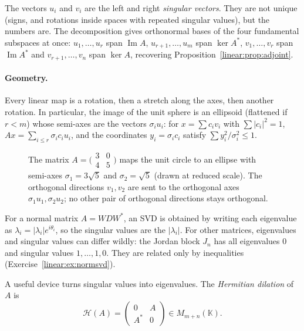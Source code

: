 The vectors $u_i$ and $v_i$ are the left and right \emph{singular vectors}. They are not unique (signs, and rotations inside
spaces with repeated singular values), but the numbers are. The decomposition gives orthonormal bases of the four
fundamental subspaces at once: $u_1,\dots,u_r$ span $\operatorname{Im}A$, $u_{r+1},\dots,u_m$ span $\ker A^*$, $v_1,\dots,v_r$
span $\operatorname{Im}A^*$ and $v_{r+1},\dots,v_n$ span $\ker A$, recovering Proposition~\ref{linear:prop:adjoint}.

\paragraph{Geometry.} Every linear map is a rotation, then a stretch along the axes, then another rotation. In particular,
the image of the unit sphere is an ellipsoid (flattened if $r<m$) whose semi-axes are the vectors $\sigma_iu_i$: for
$x=\sum c_iv_i$ with $\sum|c_i|^2=1$, $Ax=\sum_{i\le r}\sigma_ic_iu_i$, and the coordinates $y_i=\sigma_ic_i$ satisfy $\sum
y_i^2/\sigma_i^2\le1$.

\begin{figure}[ht]
\centering
{}
\caption{The matrix $A=\bigl(\begin{smallmatrix}3&0\\4&5\end{smallmatrix}\bigr)$ maps the unit circle to an ellipse with
semi-axes $\sigma_1=3\sqrt5$ and $\sigma_2=\sqrt5$ (drawn at reduced scale). The orthogonal directions $v_1,v_2$ are sent to
the orthogonal axes $\sigma_1u_1,\sigma_2u_2$; no other pair of orthogonal directions stays orthogonal.}
\label{linear:fig:ellipse}
\end{figure}

For a normal matrix $A=WDW^*$, an SVD is obtained by writing each eigenvalue as $\lambda_i=|\lambda_i|e^{i\theta_i}$, so the
singular values are the $|\lambda_i|$. For other matrices, eigenvalues and singular values can differ wildly: the Jordan
block $J_n$ has all eigenvalues $0$ and singular values $1,\dots,1,0$. They are related only by inequalities
(Exercise~\ref{linear:ex:normsvd}).

A useful device turns singular values into eigenvalues. The \emph{Hermitian dilation} of $A$ is
\[
\mathcal H(A)=\begin{pmatrix}0&A\\A^*&0\end{pmatrix}\in M_{m+n}(\mathbb K).
\]

